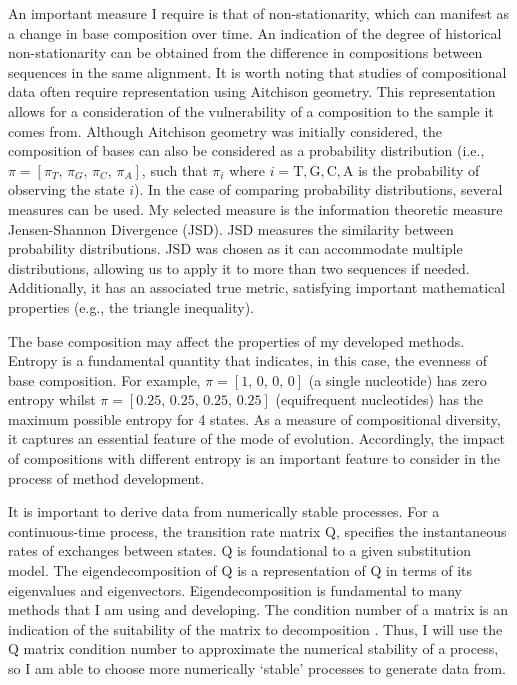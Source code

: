 An important measure I require is that of non-stationarity, which can manifest as a change in base composition over time. An indication of the degree of historical non-stationarity can be obtained from the difference in compositions between sequences in the same alignment. It is worth noting that studies of compositional data often require representation using Aitchison geometry. This representation allows for a consideration of the vulnerability of a composition to the sample it comes from. Although Aitchison geometry was initially considered, the composition of bases can also be considered as a probability distribution (i.e., $\pi = [\pi_T,\, \pi_G, \, \pi_C, \, \pi_A]$, such that $\pi_i$ where $i= \mathrm{T}, \mathrm{G}, \mathrm{C}, \mathrm{A}$ is the probability of observing the state $i$). In the case of comparing probability distributions, several measures can be used. My selected measure is the information theoretic measure Jensen-Shannon Divergence (JSD). JSD measures the similarity between probability distributions. JSD was chosen as it can accommodate multiple distributions, allowing us to apply it to more than two sequences if needed. Additionally, it has an associated true metric, satisfying important mathematical properties (e.g., the triangle inequality). 

The base composition may affect the properties of my developed methods. Entropy is a fundamental quantity that indicates, in this case, the evenness of base composition. For example, $\pi =[1,\, 0,\, 0,\, 0]$  (a single nucleotide) has zero entropy whilst  $\pi =[0.25,\, 0.25,\, 0.25,\, 0.25]$ (equifrequent nucleotides) has the maximum possible entropy for 4 states. As a measure of compositional diversity, it captures an essential feature of the mode of evolution. Accordingly, the impact of compositions with different entropy is an important feature to consider in the process of method development.

 It is important to derive data from numerically stable processes. For a continuous-time process, the transition rate matrix $\mathrm{Q}$, specifies the instantaneous rates of exchanges between states. $\mathrm{Q}$ is foundational to a given substitution model. The eigendecomposition of $\mathrm{Q}$ is a representation of $\mathrm{Q}$ in terms of its eigenvalues and eigenvectors. Eigendecomposition is fundamental to many methods that I am using and developing. The condition number of a matrix is an indication of the suitability of the matrix to decomposition \citep{Schranz2008PathologicalPathogens}. Thus, I will use the $\mathrm{Q}$ matrix condition number to approximate the numerical stability of a process, so I am able to choose more numerically `stable' processes to generate data from.

